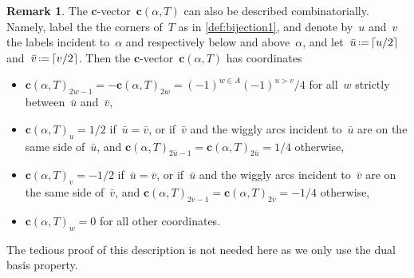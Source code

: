 \documentclass{amsart}
\theoremstyle{definition}
\newtheorem{remark}[theorem]{Remark}
\renewcommand{\b}[1]{{\boldsymbol{#1}}} %
\newcommand{\eqdef}{\mbox{\,\raisebox{0.2ex}{\scriptsize\ensuremath{\mathrm:}}\ensuremath{=}\,}} %
\begin{document}
\begin{remark}
The $\b{c}$-vector~$\b{c}(\alpha, T)$ can also be described combinatorially.
Namely, label the the corners of~$T$ as in \cref{def:bijection1}, and denote by~$u$ and~$v$ the labels incident to~$\alpha$ and respectively below and above~$\alpha$, and let~$\bar u \eqdef \lceil u/2 \rceil$ and~$\bar v \eqdef \lceil v/2 \rceil$.
Then the $\b{c}$-vector~$\b{c}(\alpha, T)$ has coordinates
\begin{itemize}
\item $\b{c}(\alpha, T)_{2w-1} = - \b{c}(\alpha, T)_{2w} = (-1)^{w \in A} (-1)^{u>v}/4$ for all~$w$ strictly between~$\bar u$ and~$\bar v$,
\item $\b{c}(\alpha, T)_u = 1/2$ if~$\bar u = \bar v$, or if~$\bar v$ and the wiggly arcs incident to~$\bar u$ are on the same side of~$\bar u$, and $\b{c}(\alpha, T)_{2\bar u-1} = \b{c}(\alpha, T)_{2\bar u} = 1/4$ otherwise,
\item $\b{c}(\alpha, T)_v = -1/2$ if~$\bar u = \bar v$, or if~$\bar u$ and the wiggly arcs incident to~$\bar v$ are on the same side of~$\bar v$, and $\b{c}(\alpha, T)_{2\bar v-1} = \b{c}(\alpha, T)_{2\bar v} = -1/4$ otherwise,
\item $\b{c}(\alpha, T)_w = 0$ for all other coordinates.
\end{itemize}
The tedious proof of this description is not needed here as we only use the dual basis property.
\end{remark}
\end{document}
